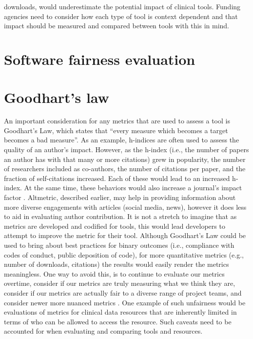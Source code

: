 \documentclass{article}
\begin{document}
downloads, would underestimate the potential impact of clinical tools. Funding agencies need to consider how each type of tool is context dependent and that impact should be measured and compared between tools with this in mind.  

\section{Software fairness evaluation}



\section{Goodhart’s law}
An important consideration for any metrics that are used to assess a tool is Goodhart’s Law, which states that “every measure which becomes a target becomes a bad measure\cite{hoskin_awful_1996}”. As an example, h-indices are often used to assess the quality of an author’s impact. However, as the h-index (i.e., the number of papers an author has with that many or more citations) grew in popularity, the number of researchers included as co-authors, the number of citations per paper, and the fraction of self-citations increased. Each of these would lead to an increased h-index. At the same time, these behaviors would also increase a journal’s impact factor \cite{fire_over-optimization_2019}. Altmetric, described earlier, may help in providing information about more diverse engagements with articles (social media, news), however it does less to aid in evaluating author contribution. It is not a stretch to imagine that as metrics are developed and codified for tools, this would lead developers to attempt to improve the metric for their tool. Although Goodhart’s Law could be used to bring about best practices for binary outcomes (i.e., compliance with codes of conduct, public deposition of code), for more quantitative metrics (e.g., number of downloads, citations) the results would easily render the metrics meaningless. One way to avoid this, is to continue to evaluate our metrics overtime, consider if our metrics are truly measuring what we think they are, consider if our metrics are actually fair to a diverse range of project teams, and consider newer more nuanced metrics \cite{fire_over-optimization_2019}. One example of such unfairness would be evaluations of metrics for clinical data resources that are inherently limited in terms of who can be allowed to access the resource. Such caveats need to be accounted for when evaluating and comparing tools and resources.
\end{document}

